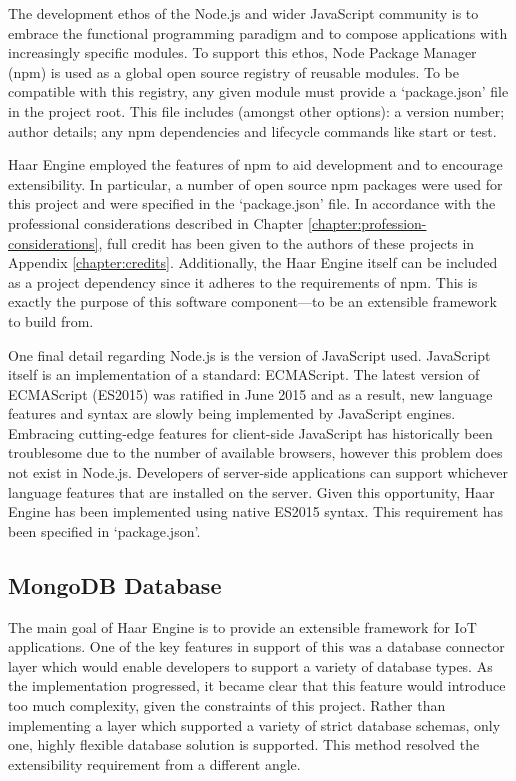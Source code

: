       The development ethos of the Node.js and wider JavaScript community is to embrace the functional programming paradigm and to compose applications with increasingly specific modules. To support this ethos, Node Package Manager (npm) is used as a global open source registry of reusable modules. To be compatible with this registry, any given module must provide a `package.json' file in the project root. This file includes (amongst other options): a version number; author details; any npm dependencies and lifecycle commands like start or test.

      Haar Engine employed the features of npm to aid development and to encourage extensibility. In particular, a number of open source npm packages were used for this project and were specified in the `package.json' file. In accordance with the professional considerations described in Chapter \ref{chapter:profession-considerations}, full credit has been given to the authors of these projects in Appendix \ref{chapter:credits}. Additionally, the Haar Engine itself can be included as a project dependency since it adheres to the requirements of npm. This is exactly the purpose of this software component---to be an extensible framework to build from.

      One final detail regarding Node.js is the version of JavaScript used. JavaScript itself is an implementation of a standard: ECMAScript. The latest version of ECMAScript (ES2015) was ratified in June 2015 \citep{es2015} and as a result, new language features and syntax are slowly being implemented by JavaScript engines. Embracing cutting-edge features for client-side JavaScript has historically been troublesome due to the number of available browsers, however this problem does not exist in Node.js. Developers of server-side applications can support whichever language features that are installed on the server. Given this opportunity, Haar Engine has been implemented using native ES2015 syntax. This requirement has been specified in `package.json'.

    \subsection{MongoDB Database}
      The main goal of Haar Engine is to provide an extensible framework for IoT applications. One of the key features in support of this was a database connector layer which would enable developers to support a variety of database types. As the implementation progressed, it became clear that this feature would introduce too much complexity, given the constraints of this project. Rather than implementing a layer which supported a variety of strict database schemas, only one, highly flexible database solution is supported. This method resolved the extensibility requirement from a different angle.

